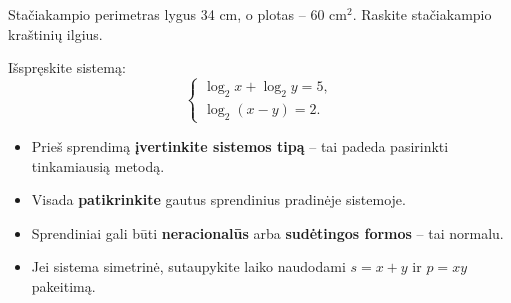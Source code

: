 \begin{exercise}
Stačiakampio perimetras lygus 34 cm, o plotas -- 60 cm$^2$. Raskite stačiakampio kraštinių ilgius.
\end{exercise}

\begin{exercise}
Išspręskite sistemą:
\[
  \begin{cases}
    \log_2 x + \log_2 y = 5,\\
    \log_2(x - y) = 2.
  \end{cases}
\]
\end{exercise}

\begin{tcolorbox}[title={VBE patarimai}, colback=blue!5!white, colframe=blue!75!black]
\begin{itemize}
  \item Prieš sprendimą \textbf{įvertinkite sistemos tipą} -- tai padeda pasirinkti tinkamiausią metodą.
  \item Visada \textbf{patikrinkite} gautus sprendinius pradinėje sistemoje.
  \item Sprendiniai gali būti \textbf{neracionalūs} arba \textbf{sudėtingos formos} -- tai normalu.
  \item Jei sistema simetrinė, sutaupykite laiko naudodami $s = x+y$ ir $p = xy$ pakeitimą.
\end{itemize}
\end{tcolorbox}

